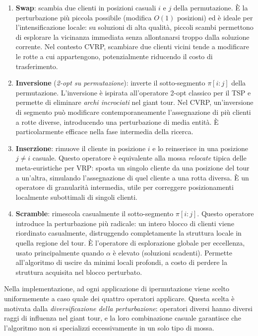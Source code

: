 \documentclass[a4paper,12pt]{article}
\begin{document}
\begin{enumerate}[label=\textbf{\arabic*.}, leftmargin=*]
    \item \textbf{Swap}: scambia due clienti in posizioni casuali $i$ e $j$ della permutazione. È la perturbazione più piccola possibile (modifica $O(1)$ posizioni) ed è ideale per l'intensificazione locale: su soluzioni di alta qualità, piccoli scambi permettono di esplorare la vicinanza immediata senza allontanarsi troppo dalla soluzione corrente. Nel contesto CVRP, scambiare due clienti vicini tende a modificare le rotte a cui appartengono, potenzialmente riducendo il costo di trasferimento.

    \item \textbf{Inversione} (\emph{2-opt su permutazione}): inverte il sotto-segmento $\pi[i{:}j]$ della permutazione. L'inversione è ispirata all'operatore 2-opt classico per il TSP e permette di eliminare \emph{archi incrociati} nel giant tour. Nel CVRP, un'inversione di segmento può modificare contemporaneamente l'assegnazione di più clienti a rotte diverse, introducendo una perturbazione di media entità. È particolarmente efficace nella fase intermedia della ricerca.

    \item \textbf{Inserzione}: rimuove il cliente in posizione $i$ e lo reinserisce in una posizione $j \neq i$ casuale. Questo operatore è equivalente alla mossa \emph{relocate} tipica delle meta-euristiche per VRP: sposta un singolo cliente da una posizione del tour a un'altra, simulando l'assegnazione di quel cliente a una rotta diversa. È un operatore di granularità intermedia, utile per correggere posizionamenti localmente subottimali di singoli clienti.

    \item \textbf{Scramble}: rimescola casualmente il sotto-segmento $\pi[i{:}j]$. Questo operatore introduce la perturbazione più radicale: un intero blocco di clienti viene riordinato casualmente, distruggendo completamente la struttura locale in quella regione del tour. È l'operatore di esplorazione globale per eccellenza, usato principalmente quando $\alpha$ è elevato (soluzioni scadenti). Permette all'algoritmo di uscire da minimi locali profondi, a costo di perdere la struttura acquisita nel blocco perturbato.
\end{enumerate}

Nella implementazione, ad ogni applicazione di ipermutazione viene scelto uniformemente a caso quale dei quattro operatori applicare. Questa scelta è motivata dalla \emph{diversificazione della perturbazione}: operatori diversi hanno diversi raggi di influenza nel giant tour, e la loro combinazione casuale garantisce che l'algoritmo non si specializzi eccessivamente in un solo tipo di mossa.
\end{document}
